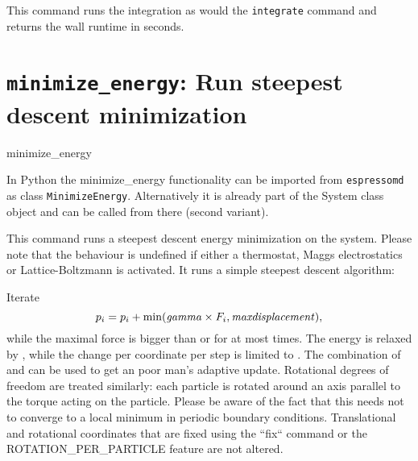 This command runs the integration as would the \texttt{integrate} command and
returns the wall runtime in seconds.

\section{\texttt{minimize_energy}: Run steepest descent minimization}

\begin{essyntax}
   minimize_energy    
\end{essyntax}

\begin{pysyntax}
\end{pysyntax}

In Python the minimize\_energy functionality can be imported from \texttt{espressomd}
as class \texttt{MinimizeEnergy}. Alternatively it is already part of the System
class object and can be called from there (second variant). 

This command runs a steepest descent energy minimization on the system.
Please note that the behaviour is undefined if either a thermostat, Maggs electrostatics or Lattice-Boltzmann is activated.
It runs a simple steepest descent algorithm:

Iterate
$$p_i = p_i + \min(\text{\var{gamma}} \times F_i, \text{\var{maxdisplacement}}),$$
while the maximal force is bigger than  or for at most  times.
The energy is relaxed by , while the change per coordinate per step is limited to .
The combination of  and  can be used to get an poor man's adaptive update.
Rotational degrees of freedom are treated similarly: each particle is rotated around an axis parallel to the torque acting on the particle.
Please be aware of the fact that this needs not to converge to a local minimum in periodic boundary conditions.
Translational and rotational coordinates that are fixed using the ``fix`` command or the ROTATION\_PER\_PARTICLE feature are not altered.

